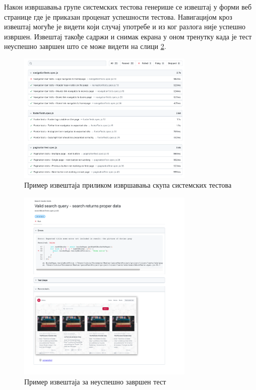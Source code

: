 \documentclass[12pt,oneside]{memoir}
\begin{document}
 Након извршавања групе системских тестова генерише се извештај у форми веб странице где је приказан проценат успешности тестова. Навигацијом кроз извештај могуће је видети који случај употребе и из ког разлога није успешно извршен. Извештај такође садржи и снимак екрана у оном тренутку када је тест неуспешно завршен што се може видети на слици \ref{fig:error}.
 
 
 \begin{figure}[!ht]
  \centering
  \includegraphics[width=0.75\textwidth]{matfmaster/img/e2e.png}
  \caption{Пример извештаја приликом извршавања скупа системских тестова}
  \label{fig:e2e}
\end{figure}



 \begin{figure}[!ht]
  \centering
  \includegraphics[width=0.75\textwidth]{matfmaster/img/error.png}
  \caption{Пример извештаја за неуспешно завршен тест}
  \label{fig:error}
\end{figure}
\end{document}

